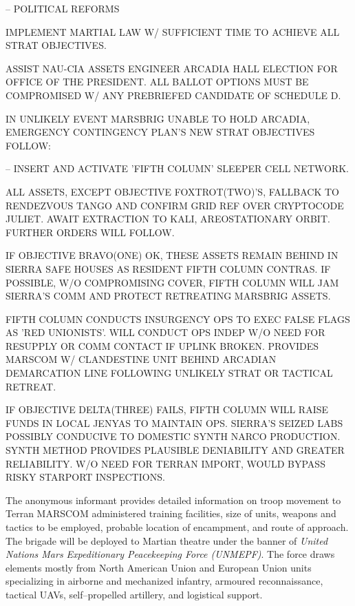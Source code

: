 \item {} -- POLITICAL REFORMS
    \startitemize[n]
    \item IMPLEMENT MARTIAL LAW W/ SUFFICIENT TIME TO ACHIEVE ALL STRAT OBJECTIVES.
    \item ASSIST NAU-CIA ASSETS ENGINEER ARCADIA HALL ELECTION FOR OFFICE OF THE PRESIDENT. ALL BALLOT OPTIONS MUST BE COMPROMISED W/ ANY PREBRIEFED CANDIDATE OF SCHEDULE D.
    \stopitemize
\stopitemize

IN UNLIKELY EVENT MARSBRIG UNABLE TO HOLD ARCADIA, EMERGENCY CONTINGENCY PLAN'S NEW STRAT OBJECTIVES FOLLOW:
\startitemize[4]
\item {} -- INSERT AND ACTIVATE 'FIFTH COLUMN' SLEEPER CELL NETWORK.

    \startitemize[n]
    \item ALL ASSETS, EXCEPT OBJECTIVE FOXTROT(TWO)'S, FALLBACK TO RENDEZVOUS TANGO AND CONFIRM GRID REF OVER CRYPTOCODE JULIET. AWAIT EXTRACTION TO KALI, AREOSTATIONARY ORBIT. FURTHER ORDERS WILL FOLLOW.

    \item IF OBJECTIVE BRAVO(ONE) OK, THESE ASSETS REMAIN BEHIND IN SIERRA SAFE HOUSES AS RESIDENT FIFTH COLUMN CONTRAS. IF POSSIBLE, W/O COMPROMISING COVER, FIFTH COLUMN WILL JAM SIERRA'S COMM AND PROTECT RETREATING MARSBRIG ASSETS.

    \item FIFTH COLUMN CONDUCTS INSURGENCY OPS TO EXEC FALSE FLAGS AS 'RED UNIONISTS'. WILL CONDUCT OPS INDEP W/O NEED FOR RESUPPLY OR COMM CONTACT IF UPLINK BROKEN. PROVIDES MARSCOM W/ CLANDESTINE UNIT BEHIND ARCADIAN DEMARCATION LINE FOLLOWING UNLIKELY STRAT OR TACTICAL RETREAT.

    \item IF OBJECTIVE DELTA(THREE) FAILS, FIFTH COLUMN WILL RAISE FUNDS IN LOCAL JENYAS TO MAINTAIN OPS. SIERRA'S SEIZED LABS POSSIBLY CONDUCIVE TO DOMESTIC SYNTH NARCO PRODUCTION. SYNTH METHOD PROVIDES PLAUSIBLE DENIABILITY AND GREATER RELIABILITY. W/O NEED FOR TERRAN IMPORT, WOULD BYPASS RISKY STARPORT INSPECTIONS.
    \stopitemize
\stopitemize
\stopTimelineCorrespondenceDocument

The anonymous informant provides detailed information on troop movement to Terran MARSCOM administered training facilities, size of units, weapons and tactics to be employed, probable location of encampment, and route of approach. The brigade will be deployed to Martian theatre under the banner of {\it United Nations Mars Expeditionary Peacekeeping Force (UNMEPF)}. The force draws elements mostly from North American Union and European Union units specializing in airborne and mechanized infantry, armoured reconnaissance, tactical UAVs, self--propelled artillery, and logistical support.

